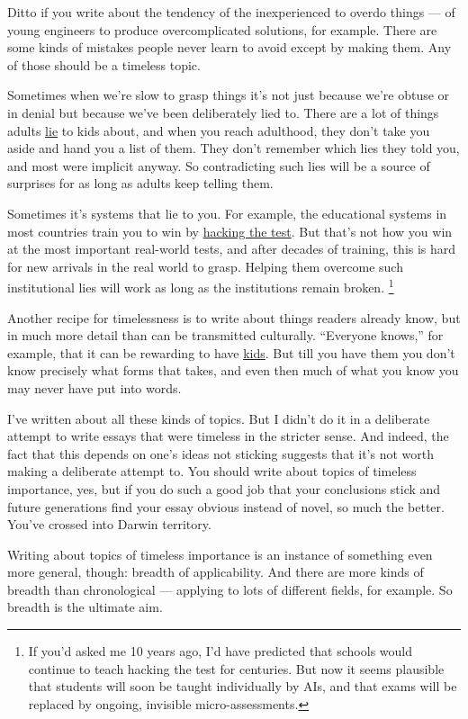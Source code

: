 \documentclass[12pt]{book}
\begin{document}
Ditto if you write about the tendency of the inexperienced to overdo
things --- of young engineers to produce overcomplicated solutions, for
example. There are some kinds of mistakes people never learn to avoid
except by making them. Any of those should be a timeless topic.

Sometimes when we're slow to grasp things it's not just because we're
obtuse or in denial but because we've been deliberately lied to. There
are a lot of things adults \href{lies.html}{lie} to kids about, and when
you reach adulthood, they don't take you aside and hand you a list of
them. They don't remember which lies they told you, and most were
implicit anyway. So contradicting such lies will be a source of
surprises for as long as adults keep telling them.

Sometimes it's systems that lie to you. For example, the educational
systems in most countries train you to win by \href{lesson.html}{hacking
the test}. But that's not how you win at the most important real-world
tests, and after decades of training, this is hard for new arrivals in
the real world to grasp. Helping them overcome such institutional lies
will work as long as the institutions remain broken.
\footnote{If you'd asked me 10 years ago, I'd have predicted that schools
would continue to teach hacking the test for centuries. But now it seems
plausible that students will soon be taught individually by AIs, and
that exams will be replaced by ongoing, invisible micro-assessments.}

Another recipe for timelessness is to write about things readers already
know, but in much more detail than can be transmitted culturally.
``Everyone knows,'' for example, that it can be rewarding to have
\href{kids.html}{kids}. But till you have them you don't know precisely
what forms that takes, and even then much of what you know you may never
have put into words.

I've written about all these kinds of topics. But I didn't do it in a
deliberate attempt to write essays that were timeless in the stricter
sense. And indeed, the fact that this depends on one's ideas not
sticking suggests that it's not worth making a deliberate attempt to.
You should write about topics of timeless importance, yes, but if you do
such a good job that your conclusions stick and future generations find
your essay obvious instead of novel, so much the better. You've crossed
into Darwin territory.

Writing about topics of timeless importance is an instance of something
even more general, though: breadth of applicability. And there are more
kinds of breadth than chronological --- applying to lots of different
fields, for example. So breadth is the ultimate aim.
\end{document}
